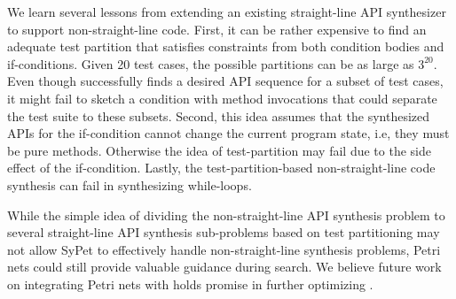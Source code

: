 We learn several lessons from extending an existing straight-line API synthesizer to support non-straight-line code. First,  it can be rather expensive to find an adequate test partition  that satisfies constraints from both condition bodies and if-conditions. Given 20 test cases, the possible partitions can be as large as $3^{20}$. Even though \spt successfully finds a desired API sequence for a subset of test cases, it might fail to sketch a condition with method invocations that could separate the test suite to these subsets. Second, this idea assumes that the synthesized APIs for the if-condition cannot change the current program state, i.e, they must be pure methods. Otherwise the idea of test-partition may fail due to the side effect of the if-condition. Lastly, the test-partition-based non-straight-line code synthesis can fail in synthesizing while-loops. 

While the simple idea of dividing the non-straight-line API synthesis
problem to several straight-line API synthesis sub-problems based on
test partitioning may not allow SyPet to effectively handle
non-straight-line synthesis problems, Petri nets could still provide
valuable guidance during search.  We believe future work on
integrating Petri nets with \tool holds promise in further optimizing
\tool.




  
  





%
%


